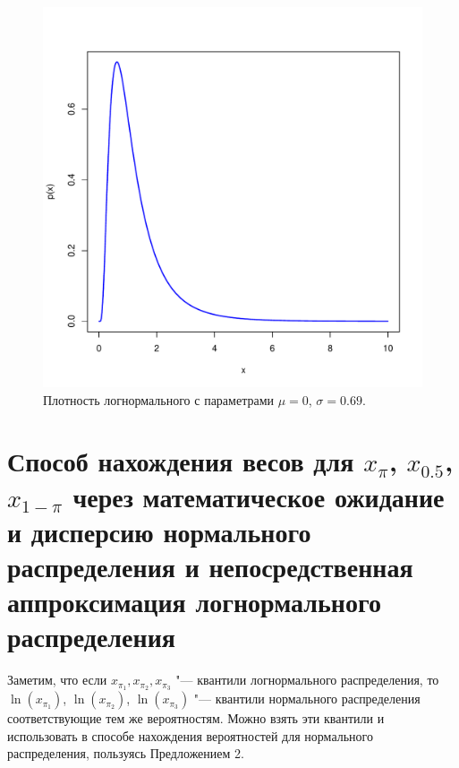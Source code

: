 \documentclass[specialist, substylefile = spbu.rtx,
subf,href,colorlinks=true, 12pt]{disser}
\begin{document}
	\begin{figure}[!hhh]
		\begin{center}
			\begin{minipage}[h]{0.8\linewidth}
				\includegraphics[width=1\linewidth]{img_new/density2.pdf}
				\caption{Плотность логнормального с параметрами $\mu = 0$, $\sigma = 0.69$. } %
				\label{ris_den2} %
			\end{minipage}
		\end{center}
	\end{figure}
	
	
	\section{Способ нахождения весов для $x_{\pi}$, $x_{0.5}$, $x_{1-\pi}$ через математическое ожидание и дисперсию нормального распределения и непосредственная аппроксимация логнормального распределения}
	Заметим, что если
	$x_{\pi_{1}}, x_{\pi_{2}}, x_{\pi_{3}}$ "--- квантили логнормального распределения, то $\ln(x_{\pi_{1}})$, $\ln(x_{\pi_{2}})$, $\ln(x_{\pi_{3}})$ "--- квантили нормального распределения соответствующие тем же вероятностям. Можно взять эти квантили и использовать в способе нахождения вероятностей для нормального распределения, пользуясь Предложением 2.
	
\end{document}
